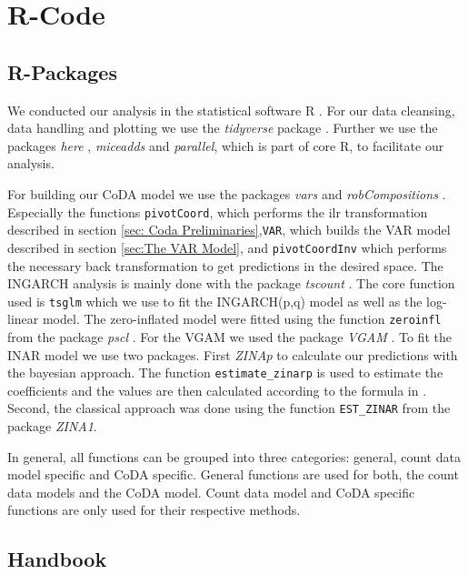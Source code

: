 \section{R-Code}
\label{sec:R-Code}

\subsection{R-Packages}
\label{sec:R-Packages}

We conducted our analysis in the statistical software R \cite{R:2022}. For our data cleansing, data handling and plotting we use the \textit{tidyverse} package \cite{Tidyverse:2019}. Further we use the packages \textit{here} \cite{here:2020}, \textit{miceadds} \cite{Miceadds:2023} and \textit{parallel}, which is part of core R, to facilitate our analysis.  

For building our CoDA model we use the packages \textit{vars} \cite{VAR:2008,CoDAR2:2008} and \textit{robCompositions} \cite{RobComp:2011,CoDAR4:2018}. Especially the functions \texttt{pivotCoord}, which performs the ilr transformation described in section \ref{sec: Coda Preliminaries},\texttt{VAR}, which builds the VAR model described in section \ref{sec:The VAR Model}, and \texttt{pivotCoordInv} which performs the necessary back transformation to get predictions in the desired space. The INGARCH analysis is mainly done with the package \textit{tscount} \cite{Tscount:2017,Tscount:2020}. The core function used is \texttt{tsglm} which we use to fit the INGARCH(p,q) model as well as the log-linear model. The zero-inflated model were fitted using the function \texttt{zeroinfl} from the package \textit{pscl} \cite{Pscl:2008}. For the VGAM we used the package \textit{VGAM} \cite{RVGAM:2010}. To fit the INAR model we use two packages. First \textit{ZINAp} to calculate our predictions with the bayesian approach. The function \texttt{estimate\_zinarp} is used to estimate the coefficients and the values are then calculated according to the formula in \cite{Silva:2009}. Second, the classical approach was done using the function \texttt{EST\_ZINAR} from the package \textit{ZINA1}.

In general, all functions can be grouped into three categories: general, count data model specific and CoDA specific. General functions are used for both, the count data models and the CoDA model. Count data model and CoDA specific functions are only used for their respective methods.
\subsection{Handbook}
\label{sec:Handbook}

